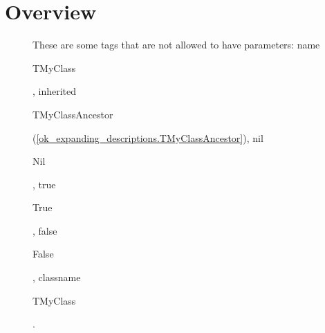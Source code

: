 \documentclass{report}
\begin{document}
\section{Overview}
\begin{description}
\item[\texttt{\begin{ttfamily}EFoo\end{ttfamily} Class}]
\item[\texttt{\begin{ttfamily}EBar\end{ttfamily} Class}]
\item[\texttt{\begin{ttfamily}EXyz\end{ttfamily} Class}]
\item[\texttt{\begin{ttfamily}TMyClassAncestor\end{ttfamily} Class}]
\item[\texttt{\begin{ttfamily}TMyClass\end{ttfamily} Class}]These are some tags that are not allowed to have parameters: name \begin{ttfamily}TMyClass\end{ttfamily}, inherited \begin{ttfamily}TMyClassAncestor\end{ttfamily}(\ref{ok_expanding_descriptions.TMyClassAncestor}), nil \begin{ttfamily}Nil\end{ttfamily}, true \begin{ttfamily}True\end{ttfamily}, false \begin{ttfamily}False\end{ttfamily}, classname \begin{ttfamily}TMyClass\end{ttfamily}.
\end{description}
\end{document}
